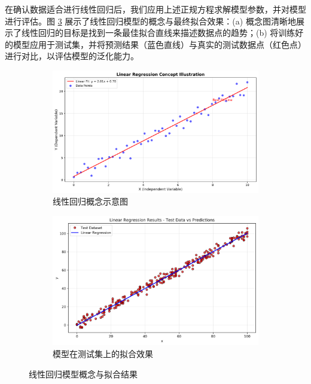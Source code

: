 \begin{itemize}
    在确认数据适合进行线性回归后，我们应用上述正规方程求解模型参数，并对模型进行评估。图 \ref{fig:lr_fit_results} 展示了线性回归模型的概念与最终拟合效果：(a) 概念图清晰地展示了线性回归的目标是找到一条最佳拟合直线来描述数据点的趋势；(b) 将训练好的模型应用于测试集，并将预测结果（蓝色直线）与真实的测试数据点（红色点）进行对比，以评估模型的泛化能力。
    
    \begin{figure}[H]
        \centering
        \begin{subfigure}[b]{0.48\textwidth}
            \centering
            \includegraphics[width=\textwidth]{figures/linear_regression_concept.png}
            \caption{线性回归概念示意图}
            \label{fig:lr_concept}
        \end{subfigure}
        \hfill
        \begin{subfigure}[b]{0.48\textwidth}
            \centering
            \includegraphics[width=\textwidth]{figures/linear_regression_results.png}
            \caption{模型在测试集上的拟合效果}
            \label{fig:lr_results}
        \end{subfigure}
        \caption{线性回归模型概念与拟合结果}
        \label{fig:lr_fit_results}
    \end{figure}

\end{itemize}

